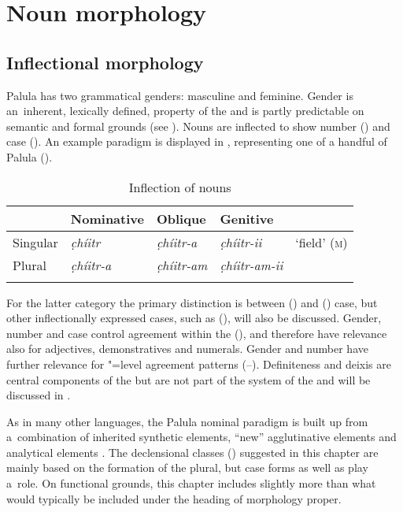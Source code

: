 \section{Noun morphology}
\label{sec:4-2}

\subsection{Inflectional morphology}
\label{subsec:4-2-1}

Palula has two grammatical genders: masculine and feminine. Gender is an~inherent, lexically defined, property of the  and is partly predictable on semantic and formal grounds (see ). Nouns are inflected to show number () and case  (). An example paradigm is displayed in , representing one of a handful of Palula  (). 


\begin{table}[ht]
\caption{Inflection of nouns}
\begin{tabularx}{\textwidth}{ Q Q Q Q Q }
\lsptoprule
&
Nominative &
Oblique &
Genitive &
\\\hline
Singular &
\textit{c̣híitr} &
\textit{c̣híitr-a} &
\textit{c̣híitr-ii} &
`field' (\textsc{m})\\
Plural &
\textit{c̣híitr-a} &
\textit{c̣híitr-am} &
\textit{c̣híitr-am-ii} &
\\\lspbottomrule
\end{tabularx}
\label{tab:4-nouns}
\end{table}


For the latter  category the primary distinction is between  () and  () case, but other inflectionally expressed cases, such as  (), will also be discussed. Gender, number and case control agreement within the   (), and therefore have relevance also for adjectives, demonstratives and numerals. Gender and number have further relevance for "=level agreement patterns (--). Definiteness and deixis are central components of the   but are not part of the  system of the  and will be discussed in .


As in many other  languages, the Palula nominal paradigm is built up from a~combination of inherited synthetic elements, ``new'' agglutinative elements and analytical elements \citep[212]{masica1991}. The declensional classes () suggested in this chapter are mainly based on the formation of the plural, but case forms as well as  play a~role. On functional grounds, this chapter includes slightly more than what would typically be included under the heading of morphology proper.


